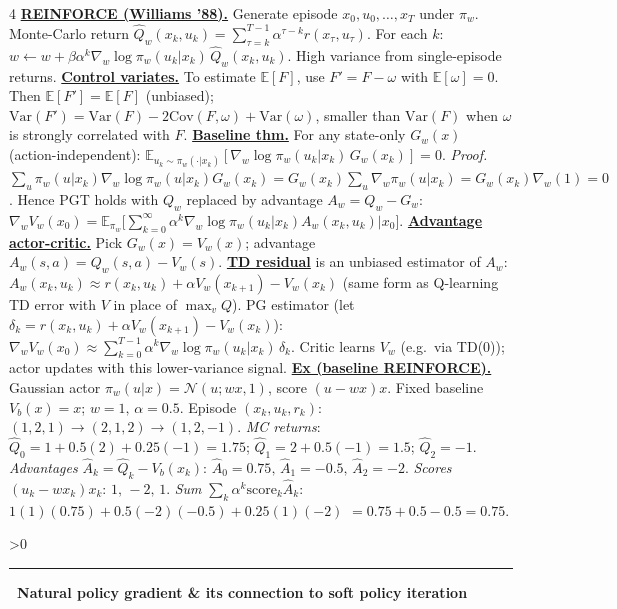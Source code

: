 \documentclass[10pt,landscape,letterpaper]{article}
\let\oldtextbf\textbf
\renewcommand{\textbf}[1]{\uline{\oldtextbf{#1}}}
\renewcommand{\section}[1]{%
  \ifnum\value{section}>0\par\vspace{1pt}\hrule\vspace{1pt}\fi
  \refstepcounter{section}\oldtextbf{\thesection\ #1}\ }
\begin{document}
\begin{multicols*}{4}
\textbf{REINFORCE (Williams '88).} Generate episode \(x_0,u_0,\ldots,x_T\) under \(\pi_w\).
Monte-Carlo return \(\hat Q_w(x_k,u_k){=}\!\sum_{\tau=k}^{T-1}\!\alpha^{\tau-k}r(x_\tau,u_\tau)\).
For each \(k\): \(w\leftarrow w+\beta\alpha^k\nabla_w\log\pi_w(u_k|x_k)\,\hat Q_w(x_k,u_k)\).
High variance from single-episode returns.
\textbf{Control variates.} To estimate \(\mathbb E[F]\), use \(F'=F-\omega\) with \(\mathbb E[\omega]=0\).
Then \(\mathbb E[F']=\mathbb E[F]\) (unbiased); \(\mathrm{Var}(F')=\mathrm{Var}(F)-2\mathrm{Cov}(F,\omega)+\mathrm{Var}(\omega)\),
smaller than \(\mathrm{Var}(F)\) when \(\omega\) is strongly correlated with \(F\).
\textbf{Baseline thm.} For any state-only \(G_w(x)\) (action-independent):
\(\mathbb E_{u_k\sim\pi_w(\cdot|x_k)}[\nabla_w\log\pi_w(u_k|x_k)\,G_w(x_k)]=0\).
\emph{Proof.} \(\sum_u\pi_w(u|x_k)\nabla_w\log\pi_w(u|x_k)G_w(x_k)=G_w(x_k)\!\sum_u\!\nabla_w\pi_w(u|x_k)=G_w(x_k)\nabla_w(1)=0\).
Hence PGT holds with \(Q_w\) replaced by advantage \(A_w=Q_w-G_w\):
\(\nabla_w V_w(x_0)=\mathbb E_{\pi_w}\!\big[\sum_{k=0}^\infty\alpha^k\nabla_w\log\pi_w(u_k|x_k)A_w(x_k,u_k)\big|x_0\big]\).
\textbf{Advantage actor-critic.} Pick \(G_w(x)=V_w(x)\); advantage \(A_w(s,a)=Q_w(s,a)-V_w(s)\).
\textbf{TD residual} is an unbiased estimator of \(A_w\):
\(A_w(x_k,u_k)\approx r(x_k,u_k)+\alpha V_w(x_{k+1})-V_w(x_k)\) (same form as Q-learning TD error with \(V\) in place of \(\max_v Q\)).
PG estimator (let \(\delta_k=r(x_k,u_k)+\alpha V_w(x_{k+1})-V_w(x_k)\)):
\(\nabla_w V_w(x_0)\approx\sum_{k=0}^{T-1}\alpha^k\nabla_w\log\pi_w(u_k|x_k)\,\delta_k\).
Critic learns \(V_w\) (e.g.\ via TD(0)); actor updates with this lower-variance signal.
\textbf{Ex (baseline REINFORCE).} Gaussian actor \(\pi_w(u|x){=}\mathcal N(u;wx,1)\), score \((u{-}wx)x\). Fixed baseline \(V_b(x){=}x\); \(w{=}1,\,\alpha{=}0.5\).
Episode \((x_k,u_k,r_k)\): \((1,2,1)\!\to\!(2,1,2)\!\to\!(1,2,{-}1)\).
\emph{MC returns}: \(\hat Q_0{=}1{+}0.5(2){+}0.25({-}1){=}1.75\); \(\hat Q_1{=}2{+}0.5({-}1){=}1.5\); \(\hat Q_2{=}{-}1\).
\emph{Advantages} \(\hat A_k{=}\hat Q_k{-}V_b(x_k)\): \(\hat A_0{=}0.75,\,\hat A_1{=}{-}0.5,\,\hat A_2{=}{-}2\).
\emph{Scores} \((u_k{-}wx_k)x_k\): \(1,\,{-}2,\,1\).
\emph{Sum} \(\sum_k\alpha^k\text{score}_k\hat A_k\):
\(1(1)(0.75){+}0.5({-}2)({-}0.5){+}0.25(1)({-}2)\)
\(=0.75{+}0.5{-}0.5=\mathbf{0.75}\).

\section{Natural policy gradient \& its connection to soft policy iteration}


\end{multicols*}
\end{document}

